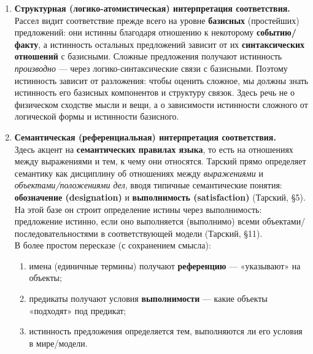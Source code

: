 \documentclass[a4paper,12pt]{article}
\begin{document}
\begin{enumerate}
  \item \textbf{Структурная (логико-атомистическая) интерпретация соответствия.}\\
  Рассел видит соответствие  прежде всего на уровне \textbf{базисных} (простейших) предложений: они истинны благодаря отношению к некоторому \textbf{событию/факту}, а истинность остальных предложений зависит от их \textbf{синтаксических отношений} с базисными. {Сложные предложения} получают истинность \emph{производно} — через логико-синтаксические связи с базисными. Поэтому истинность зависит от разложения: чтобы оценить сложное, мы должны знать истинность его базисных компонентов и структуру связок.
  Здесь речь не о физическом сходстве мысли и вещи, а о зависимости истинности сложного от логической формы и истинности базисного.

  \item \textbf{Семантическая (референциальная) интерпретация соответствия.}\\
  Здесь акцент на \textbf{семантических правилах языка}, то есть на отношениях между выражениями и тем, к чему они относятся. Тарский прямо определяет семантику как дисциплину об отношениях между \emph{выражениями} и \emph{объектами/положениями дел}, вводя типичные семантические понятия: \textbf{обозначение (designation)} и \textbf{выполнимость (satisfaction)} (Тарский, \S 5). На этой базе он строит определение истины через выполнимость: предложение истинно, если оно выполняется (выполнимо) всеми объектами/последовательностями в соответствующей модели (Тарский, \S 11).\\
  В более простом пересказе (с сохранением смысла): 
  \begin{enumerate}
    \item имена (единичные термины) получают \textbf{референцию} — «указывают» на объекты;
    \item предикаты получают условия \textbf{выполнимости} — какие объекты «подходят» под предикат;
    \item истинность предложения определяется тем, выполняются ли его условия в мире/модели.
  \end{enumerate}

\end{enumerate}
\end{document}
